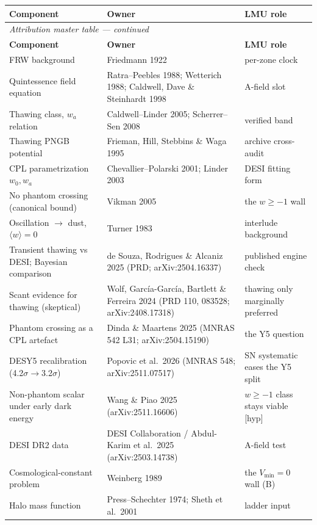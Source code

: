 \documentclass[11pt]{article}
\begin{document}
\begin{small}\setlength\LTleft{\fill}\setlength\LTright{\fill}
\begin{longtable}{p{}p{}p{}}
\toprule
\textbf{Component} & \textbf{Owner} & \textbf{LMU role}\\\midrule
\endfirsthead
\multicolumn{3}{l}{\footnotesize\emph{Attribution master table --- continued}}\\\toprule
\textbf{Component} & \textbf{Owner} & \textbf{LMU role}\\\midrule
\endhead
FRW background & Friedmann 1922 & per-zone clock\\
Quintessence field equation & Ratra--Peebles 1988; Wetterich 1988; Caldwell, Dave \& Steinhardt 1998 & A-field slot\\
Thawing class, $w_a$ relation & Caldwell--Linder 2005; Scherrer--Sen 2008 & verified band\\
Thawing PNGB potential & Frieman, Hill, Stebbins \& Waga 1995 & archive cross-audit\\
CPL parametrization $w_0,w_a$ & Chevallier--Polarski 2001; Linder 2003 & DESI fitting form\\
No phantom crossing (canonical bound) & Vikman 2005 & the $w\ge-1$ wall\\
Oscillation $\to$ dust, $\langle w\rangle=0$ & Turner 1983 & interlude background\\
Transient thawing vs DESI; Bayesian comparison & de Souza, Rodrigues \& Alcaniz 2025 (PRD; arXiv:2504.16337) & published engine check\\
Scant evidence for thawing (skeptical) & Wolf, Garc\'ia-Garc\'ia, Bartlett \& Ferreira 2024 (PRD 110, 083528; arXiv:2408.17318) & thawing only marginally preferred\\
Phantom crossing as a CPL artefact & Dinda \& Maartens 2025 (MNRAS 542 L31; arXiv:2504.15190) & the Y5 question\\
DESY5 recalibration (4.2$\sigma\!\to\!$3.2$\sigma$) & Popovic et al.\ 2026 (MNRAS 548; arXiv:2511.07517) & SN systematic eases the Y5 split\\
Non-phantom scalar under early dark energy & Wang \& Piao 2025 (arXiv:2511.16606) & $w\ge-1$ class stays viable [hyp]\\
DESI DR2 data & DESI Collaboration / Abdul-Karim et al.\ 2025 (arXiv:2503.14738) & A-field test\\
Cosmological-constant problem & Weinberg 1989 & the $V_{\min}=0$ wall (B)\\
Halo mass function & Press--Schechter 1974; Sheth et al.\ 2001 & ladder input\\

\end{longtable}
\end{small}
\end{document}
